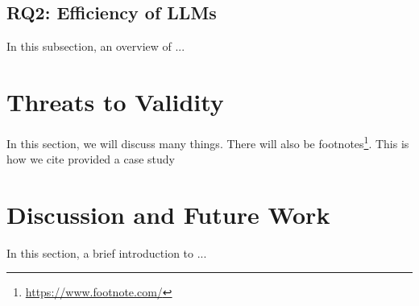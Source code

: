 \vspace{0.1 cm}
\subsection{RQ2: Efficiency of LLMs}
\label{sec:results_rq2}
\vspace{0.1 cm}

In this subsection, an overview of ...

\section{Threats to Validity}
\label{sec:t2v}
\vspace{0.2 cm}

In this section, we will discuss many things. There will also be footnotes\footnote{ \url{https://www.footnote.com/} }. This is how we cite\cite{Nguyen2019} provided a case study

\section{Discussion and Future Work}
\label{sec:discussion}
\vspace{0.2 cm}

In this section, a brief introduction to ... 




